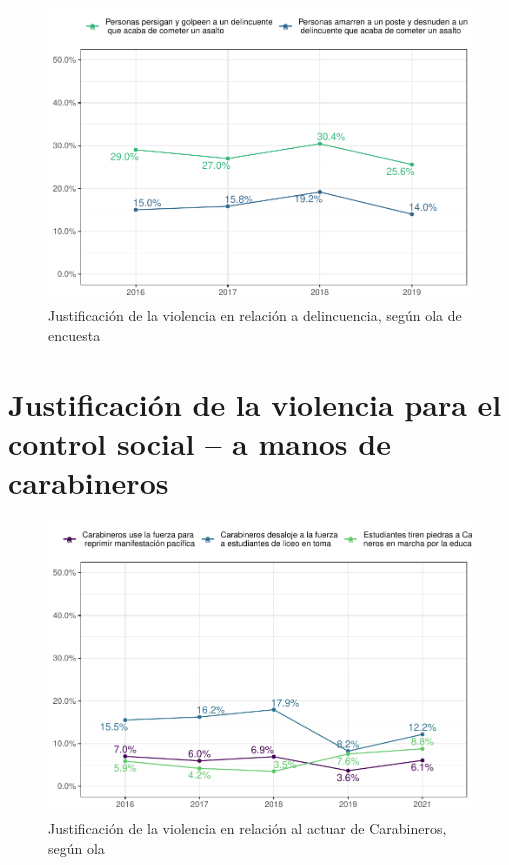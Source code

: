 \documentclass[
  12pt,
  openany]{book}
\begin{document}
\begin{figure}
\centering
\includegraphics{reporte-elsoc_files/figure-latex/just-vio-ola-1.pdf}
\caption{\label{fig:just-vio-ola}Justificación de la violencia en relación a delincuencia, según ola de encuesta}
\end{figure}

\hypertarget{justificaciuxf3n-de-la-violencia-para-el-control-social-a-manos-de-carabineros}{%
\section{Justificación de la violencia para el control social -- a manos de carabineros}\label{justificaciuxf3n-de-la-violencia-para-el-control-social-a-manos-de-carabineros}}

\begin{figure}

{\centering \includegraphics{reporte-elsoc_files/figure-latex/just-carab-ola-1} 

}

\caption{Justificación de la violencia en relación al actuar de Carabineros, según ola}\label{fig:just-carab-ola}
\end{figure}
\end{document}
